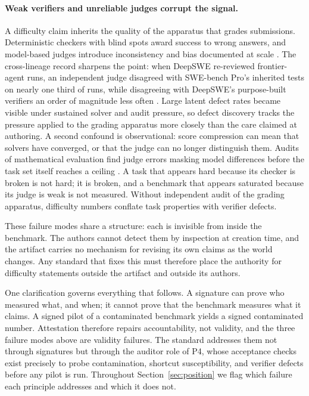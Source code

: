\documentclass[11pt]{article}
\begin{document}
\paragraph{Weak verifiers and unreliable judges corrupt the signal.}
A difficulty claim inherits the quality of the apparatus that grades submissions. Deterministic checkers with blind spots award success to wrong answers, and model-based judges introduce inconsistency and bias documented at scale \citep{norman2026reliability, yagubyan2026coinflip}. The cross-lineage record sharpens the point: when DeepSWE re-reviewed frontier-agent runs, an independent judge disagreed with SWE-bench Pro's inherited tests on nearly one third of runs, while disagreeing with DeepSWE's purpose-built verifiers an order of magnitude less often \citep{huang2026deepswe}. Large latent defect rates became visible under sustained solver and audit pressure, so defect discovery tracks the pressure applied to the grading apparatus more closely than the care claimed at authoring. A second confound is observational: score compression can mean that solvers have converged, or that the judge can no longer distinguish them. Audits of mathematical evaluation find judge errors masking model differences before the task set itself reaches a ceiling \citep{ballon2026benchmarks}. A task that appears hard because its checker is broken is not hard; it is broken, and a benchmark that appears saturated because its judge is weak is not measured. Without independent audit of the grading apparatus, difficulty numbers conflate task properties with verifier defects.

These failure modes share a structure: each is invisible from inside the benchmark. The authors cannot detect them by inspection at creation time, and the artifact carries no mechanism for revising its own claims as the world changes. Any standard that fixes this must therefore place the authority for difficulty statements outside the artifact and outside its authors.

One clarification governs everything that follows. A signature can prove who measured what, and when; it cannot prove that the benchmark measures what it claims. A signed pilot of a contaminated benchmark yields a signed contaminated number. Attestation therefore repairs accountability, not validity, and the three failure modes above are validity failures. The standard addresses them not through signatures but through the auditor role of P4, whose acceptance checks exist precisely to probe contamination, shortcut susceptibility, and verifier defects before any pilot is run. Throughout Section~\ref{sec:position} we flag which failure each principle addresses and which it does not.
\end{document}

